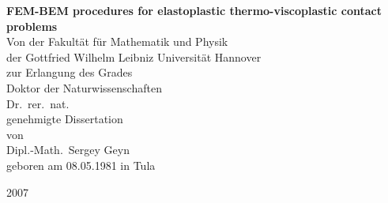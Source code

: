 \begin{titlepage}
\pagestyle{empty}
\begin{center} 

\vspace*{1cm}
\huge{\bf\sf  FEM-BEM procedures for elastoplastic thermo-viscoplastic contact problems}\\
\vspace{2cm}
\large
 Von der Fakult\"at f\"ur Mathematik und Physik\\der Gottfried Wilhelm Leibniz Universit\"at Hannover\\
zur Erlangung des Grades\\Doktor der Naturwissenschaften\\Dr.\ rer.\ nat.\\
\vspace{2cm}
genehmigte Dissertation\\
\vspace{1.5cm}
von\\
\vspace{1.5cm}
\Large
Dipl.-Math.\ Sergey Geyn\\
\vspace{0.5cm}
\normalsize
geboren am 08.05.1981 in Tula

\vspace{1.0cm}
\large
2007
\vspace*{-2.0cm}
\end{center}
\end{titlepage}

